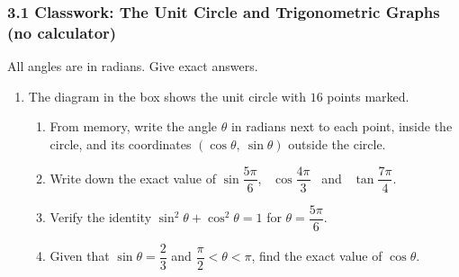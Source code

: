 \documentclass[12pt, twoside]{article}
\begin{document}
\subsubsection*{3.1 Classwork: The Unit Circle and Trigonometric Graphs (no calculator)}

All angles are in radians. Give exact answers.

\begin{enumerate}[itemsep=0.15cm]

\item[1.]

The diagram in the box shows the unit circle with $16$ points marked.

\begin{enumerate}[itemsep=0.1cm]
  \item From memory, write the angle $\theta$ in radians next to each
  point, inside the circle, and its coordinates
  $\left(\cos\theta,\ \sin\theta\right)$ outside the circle.
  \item Write down the exact value of
  $\sin\dfrac{5\pi}{6}$, \ $\cos\dfrac{4\pi}{3}$ \ and \ $\tan\dfrac{7\pi}{4}$.
  \item Verify the identity $\sin^{2}\theta + \cos^{2}\theta = 1$ for
  $\theta = \dfrac{5\pi}{6}$.
  \item Given that $\sin\theta = \dfrac{2}{3}$ and
  $\dfrac{\pi}{2} < \theta < \pi$, find the exact value of $\cos\theta$.
\end{enumerate}


\newpage


\end{enumerate}
\end{document}

